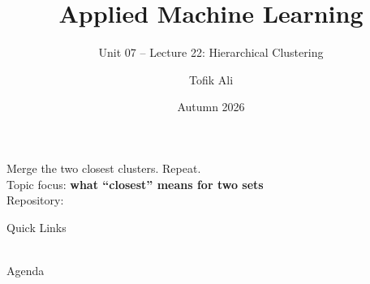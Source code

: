 \documentclass[aspectratio=169]{beamer}
\title[Applied Machine Learning]{Applied Machine Learning}
\subtitle{Unit 07 -- Lecture 22: Hierarchical Clustering}
\author{Tofik Ali}
\institute{School of Computer Science, UPES Dehradun}
\date{Autumn 2026}
\begin{document}
\UPESCoverFrame
\setcounter{framenumber}{0}

\begin{frame}
  \titlepage
  \begin{center}
    \footnotesize Merge the two closest clusters. Repeat.\\[0.25em]
    \footnotesize Topic focus: \textbf{what ``closest'' means for two sets}\\[0.25em]
    \footnotesize Repository: \texttt{\AMLRepoURL}
  \end{center}
  \slidesources{\AMLUnitVIISources}
\end{frame}

\begin{frame}{Quick Links}
  \centering
  \hyperlink{sec:tree}{}\hspace{0.4em}
  \hyperlink{sec:algo}{}\hspace{0.4em}
  \hyperlink{sec:single}{}\hspace{0.4em}
  \hyperlink{sec:complete}{}\\[0.6em]
  \hyperlink{sec:linkage}{}\hspace{0.4em}
  \hyperlink{sec:lw}{}\hspace{0.4em}
  \hyperlink{sec:shape}{}\hspace{0.4em}
  \hyperlink{sec:inv}{}\\[0.6em]
  \hyperlink{sec:cut}{}\hspace{0.4em}
  \hyperlink{sec:cost}{}\hspace{0.4em}
  \hyperlink{sec:div}{}\hspace{0.4em}
  \hyperlink{sec:summary}{}
\end{frame}

\begin{frame}{Agenda}
  \tableofcontents
\end{frame}
\end{document}

